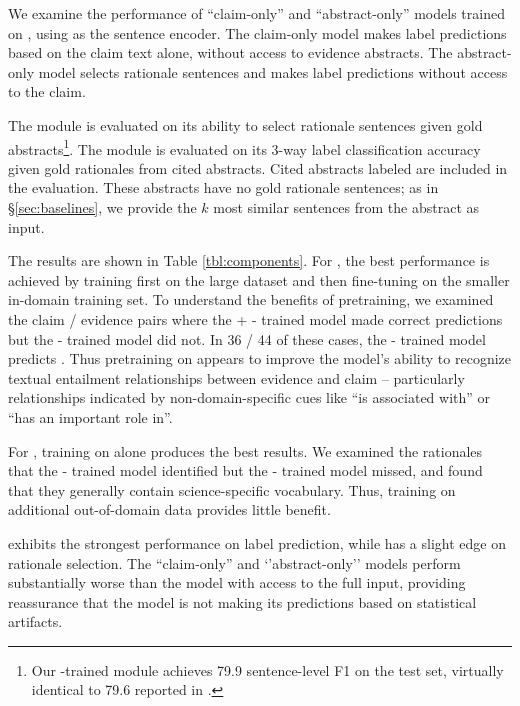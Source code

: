 \vspace{.2cm} 
We examine the performance of ``claim-only'' and ``abstract-only'' models trained on \ours, using \robertalarge as the sentence encoder. The claim-only model makes label predictions based on the claim text alone, without access to evidence abstracts. The abstract-only model selects rationale sentences and makes label predictions without access to the claim.



The \componenttwo module is evaluated on its ability to select rationale sentences given gold abstracts\footnote{Our \fever-trained \componenttwo module achieves 79.9 sentence-level F1 on the \fever test set, virtually identical to 79.6 reported in \citet{DeYoung2019ERASERAB}.}. The \componentthree module is evaluated on its 3-way label classification accuracy given gold rationales from cited abstracts. Cited abstracts labeled \notenough are included in the evaluation. These abstracts have no gold rationale sentences; as in \S\ref{sec:baselines}, we provide the $k$ most similar sentences from the abstract as input.

\vspace{.2cm}  The results are shown in Table \ref{tbl:components}. For \componentthree, the best performance is achieved by training first on the large \fever dataset and then fine-tuning on the smaller in-domain \ours training set. To understand the benefits of \fever pretraining, we examined the claim / evidence pairs where the \fever + \ours - trained model made correct predictions but the \ours - trained model did not. In  36 / 44 of these cases, the \ours - trained model predicts \notenough. Thus pretraining on \fever appears to improve the model's ability to recognize textual entailment relationships between evidence and claim -- particularly relationships indicated by non-domain-specific cues like ``is associated with'' or ``has an important role in''.

For \componenttwo, training on \ours alone produces the best results. We examined the rationales that the \ours - trained model identified but the \fever - trained model missed, and found that they generally contain science-specific vocabulary. Thus, training on additional out-of-domain data provides little benefit.

\robertalarge exhibits the strongest performance on label prediction, while \scibert has a slight edge on rationale selection. The ``claim-only'' and `'abstract-only'' models perform substantially worse than the model with access to the full input, providing reassurance that the model is not making its predictions based on statistical artifacts.



